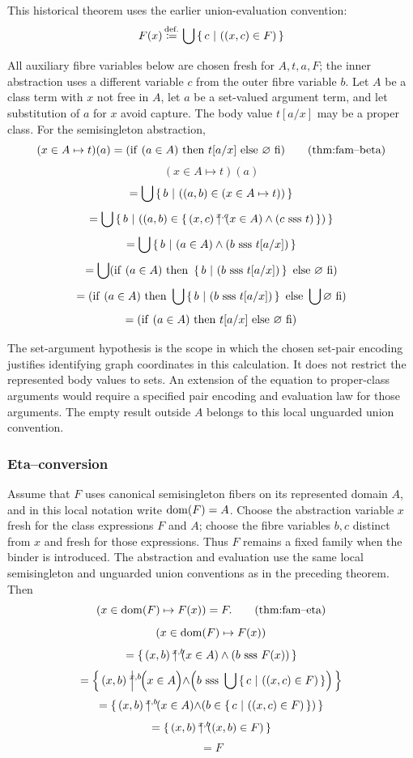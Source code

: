 \begin{theorem}
This historical theorem uses the earlier union-evaluation convention:
\[
F(x) \,{\stackrel{{\textrm{def.}}}{\coloneqq}}\, \bigcup\left\{\,c\ \middle|\ ((x,c)\in F)\,\right\}
\]

All auxiliary fibre variables below are chosen fresh for $A,t,a,F$;
the inner abstraction uses a different variable $c$ from the outer fibre
variable $b$. Let $A$ be a class term with $x$ not free in $A$, let
$a$ be a set-valued argument term, and let substitution of $a$ for $x$
avoid capture. The body value $t[a/x]$ may be a proper class. For the
semisingleton abstraction,
\[
(x\in A \mapsto t)(a) = (\lif\ (a\in A)\ \lthen\ t[a/x]\ \lelse\ \emptyclass\ \lfi)
\clabeltagd{thm}{fam--beta}
\]
\Proof
\[
(x\in A \mapsto t)(a)
\]
\[
=
\bigcup\left\{\,b\ \middle|\ ((a,b)\in (x\in A \mapsto t))\,\right\}
\]
\[
=
\bigcup\cc{b}{((a,b)\in \ccc{x,c}{(x,c)}{(x\in A)\land (c \sss t)})}
\]
\[
=
\bigcup\left\{\,b\ \middle|\ (a\in A)\land (b \mathrm{\ sss\ } t[a/x])\,\right\}
\]
\[
=
\bigcup (\lif\ (a\in A)\ \lthen\ \cc{b}{(b \sss t[a/x])}\ \lelse\  \emptyclass\ \lfi)
\]
\[
=
(\lif\ (a\in A)\ \lthen\ \bigcup\cc{b}{(b \sss t[a/x])}\ \lelse\  \bigcup\emptyclass\ \lfi)
\]
\[
=
(\mathrm{if}\ (a\in A)\ \mathrm{then}\ t[a/x]\ \mathrm{else}\ \varnothing\ \mathrm{fi})
\]
\Done
\end{theorem}
The set-argument hypothesis is the scope in which the chosen set-pair
encoding justifies identifying graph coordinates in this calculation.
It does not restrict the represented body values to sets. An extension
of the equation to proper-class arguments would require a specified
pair encoding and evaluation law for those arguments. The empty result
outside $A$ belongs to this local unguarded union convention.

\subsubsection{Eta--conversion}
\begin{theorem}
Assume that $F$ uses canonical semisingleton fibers on its represented
domain $A$, and in this local notation write $\mathrm{dom}(F)=A$. Choose the
abstraction variable $x$ fresh for the class expressions $F$ and $A$;
choose the fibre variables $b,c$ distinct from $x$ and fresh for those
expressions. Thus $F$ remains a fixed family when the binder is introduced.
The abstraction and evaluation use the same local semisingleton and
unguarded union conventions as in the preceding theorem. Then
\[
(x\in \dom(F) \mapsto F(x))=F.
\clabeltagd{thm}{fam--eta}
\]
\Proof
\[
(x\in \mathrm{dom}(F) \mapsto F(x))
\]
\[
=\ccc{x,b}{(x,b)}{(x\in A)\land (b \sss F(x))}
\]
\[
=\ccc{x,b}{(x,b)}{\left(x\in A\middle)\land \middle(b \sss \bigcup\cc{c}{((x,c)\in F)}\right)}
\]
\[
=\ccc{x,b}{(x,b)}{\left(x\in A\middle)\land \middle(b \in \cc{c}{((x,c)\in F)}\right)}
\]
\[
=\ccc{x,b}{(x,b)}{((x,b)\in F)}
\]
\[
=F
\]
\Done
\end{theorem}

